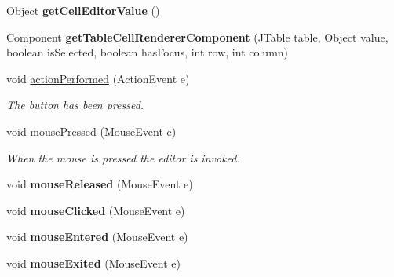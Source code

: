 \begin{DoxyCompactItemize}
\item 
\hypertarget{classedu_1_1udel_1_1cis_1_1vsl_1_1civl_1_1gui_1_1common_1_1ButtonColumn_a83e8a5d4246f0174be4e81eb7840a871}{}Object {\bfseries get\+Cell\+Editor\+Value} ()\label{classedu_1_1udel_1_1cis_1_1vsl_1_1civl_1_1gui_1_1common_1_1ButtonColumn_a83e8a5d4246f0174be4e81eb7840a871}

\item 
\hypertarget{classedu_1_1udel_1_1cis_1_1vsl_1_1civl_1_1gui_1_1common_1_1ButtonColumn_afd866522d57bd0c5173a928e6b8cbdbf}{}Component {\bfseries get\+Table\+Cell\+Renderer\+Component} (J\+Table table, Object value, boolean is\+Selected, boolean has\+Focus, int row, int column)\label{classedu_1_1udel_1_1cis_1_1vsl_1_1civl_1_1gui_1_1common_1_1ButtonColumn_afd866522d57bd0c5173a928e6b8cbdbf}

\item 
void \hyperlink{classedu_1_1udel_1_1cis_1_1vsl_1_1civl_1_1gui_1_1common_1_1ButtonColumn_ad74613afd6c6d81a10a8b5e33a724cf7}{action\+Performed} (Action\+Event e)
\begin{DoxyCompactList}\small\item\em The button has been pressed. \end{DoxyCompactList}\item 
void \hyperlink{classedu_1_1udel_1_1cis_1_1vsl_1_1civl_1_1gui_1_1common_1_1ButtonColumn_a031b418abed0673c1ba682e572ed2b23}{mouse\+Pressed} (Mouse\+Event e)
\begin{DoxyCompactList}\small\item\em When the mouse is pressed the editor is invoked. \end{DoxyCompactList}\item 
\hypertarget{classedu_1_1udel_1_1cis_1_1vsl_1_1civl_1_1gui_1_1common_1_1ButtonColumn_a428c49b76f09eda7dc734c1e6f678a30}{}void {\bfseries mouse\+Released} (Mouse\+Event e)\label{classedu_1_1udel_1_1cis_1_1vsl_1_1civl_1_1gui_1_1common_1_1ButtonColumn_a428c49b76f09eda7dc734c1e6f678a30}

\item 
\hypertarget{classedu_1_1udel_1_1cis_1_1vsl_1_1civl_1_1gui_1_1common_1_1ButtonColumn_ae3e509e2327524d1bdecf1f02c7441fc}{}void {\bfseries mouse\+Clicked} (Mouse\+Event e)\label{classedu_1_1udel_1_1cis_1_1vsl_1_1civl_1_1gui_1_1common_1_1ButtonColumn_ae3e509e2327524d1bdecf1f02c7441fc}

\item 
\hypertarget{classedu_1_1udel_1_1cis_1_1vsl_1_1civl_1_1gui_1_1common_1_1ButtonColumn_a4fbb7479c401f6eb56888d1e2cc93425}{}void {\bfseries mouse\+Entered} (Mouse\+Event e)\label{classedu_1_1udel_1_1cis_1_1vsl_1_1civl_1_1gui_1_1common_1_1ButtonColumn_a4fbb7479c401f6eb56888d1e2cc93425}

\item 
\hypertarget{classedu_1_1udel_1_1cis_1_1vsl_1_1civl_1_1gui_1_1common_1_1ButtonColumn_aff4f8b880dfe3508911b88e51c29f40b}{}void {\bfseries mouse\+Exited} (Mouse\+Event e)\label{classedu_1_1udel_1_1cis_1_1vsl_1_1civl_1_1gui_1_1common_1_1ButtonColumn_aff4f8b880dfe3508911b88e51c29f40b}

\end{DoxyCompactItemize}


